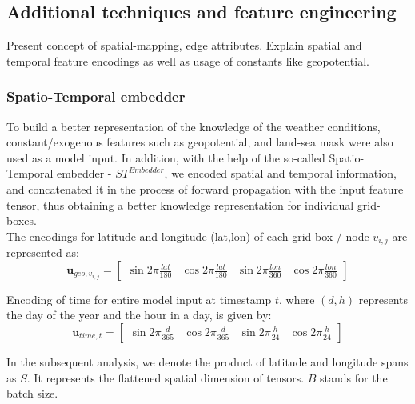 

\subsection{Additional techniques and feature engineering}\label{chap:feat_eng}
Present concept of spatial-mapping, edge attributes. Explain spatial and temporal feature encodings as well as usage of constants like geopotential. 

\subsubsection{Spatio-Temporal embedder}
To build a better representation of the knowledge of the weather conditions, constant/exogenous features such as geopotential, and land-sea mask were also used as a model input. In addition, with the help of the so-called Spatio-Temporal embedder - $ST^{Embedder}$, we encoded spatial and temporal information, and concatenated it in the process of forward propagation with the input feature tensor, thus obtaining a better knowledge representation for individual grid-boxes. \\

\noindent The encodings for latitude and longitude (lat,lon) of each grid box / node $v_{i,j}$ are represented as:
\[
\mathbf{u}_{geo, v_{i,j}} =
\begin{bmatrix}
    \sin{2\pi\frac{lat}{180}} &
    \cos{2\pi\frac{lat}{180}} &
    \sin{2\pi\frac{lon}{360}} &
    \cos{2\pi\frac{lon}{360}}
\end{bmatrix}
\]

\noindent Encoding of time for entire model input at timestamp $t$, where $(d, h)$ represents the day of the year and the hour in a day, is given by:
\[
\mathbf{u}_{time,t} =
\begin{bmatrix}
    \sin{2\pi\frac{d}{365}} &
    \cos{2\pi\frac{d}{365}} &
    \sin{2\pi\frac{h}{24}} &
    \cos{2\pi\frac{h}{24}}
\end{bmatrix}
\]

\noindent In the subsequent analysis, we denote the product of latitude and longitude spans as $S$. It represents the flattened spatial dimension of tensors. $B$ stands for the batch size. \\ 

